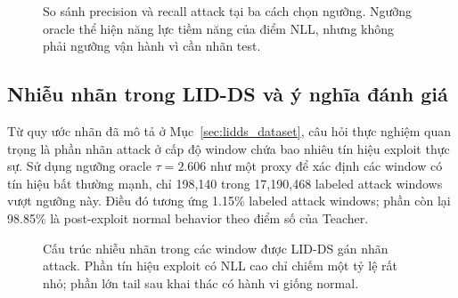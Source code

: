 \documentclass[../main.tex]{subfiles}
\begin{document}
\begin{figure}[H]
  \centering
  \caption{So sánh precision và recall attack tại ba cách chọn
    ngưỡng. Ngưỡng oracle
    thể hiện năng lực tiềm năng của điểm NLL, nhưng không phải ngưỡng
    vận hành vì cần
  nhãn test.}
  \label{fig:threshold_tradeoff}
\end{figure}

\subsection{Nhiễu nhãn trong LID-DS và ý nghĩa đánh giá}
\label{subsec:label_contamination}

Từ quy ước nhãn đã mô tả ở Mục~\ref{sec:lidds_dataset}, câu hỏi thực
nghiệm quan trọng
là phần nhãn attack ở cấp độ window chứa bao nhiêu tín hiệu exploit
thực sự. Sử dụng
ngưỡng oracle $\tau = 2.606$ như một proxy để xác định các window có
tín hiệu bất thường
mạnh, chỉ 198,140 trong 17,190,468 labeled attack windows vượt ngưỡng
này. Điều đó tương
ứng 1.15\% labeled attack windows; phần còn lại 98.85\% là
post-exploit normal behavior
theo điểm số của Teacher.

\begin{figure}[H]
  \centering
  \caption{Cấu trúc nhiễu nhãn trong các window được LID-DS gán nhãn
    attack. Phần tín
    hiệu exploit có NLL cao chỉ chiếm một tỷ lệ rất nhỏ; phần lớn
    tail sau khai thác có
  hành vi giống normal.}
  \label{fig:label_contamination}
\end{figure}
\end{document}
